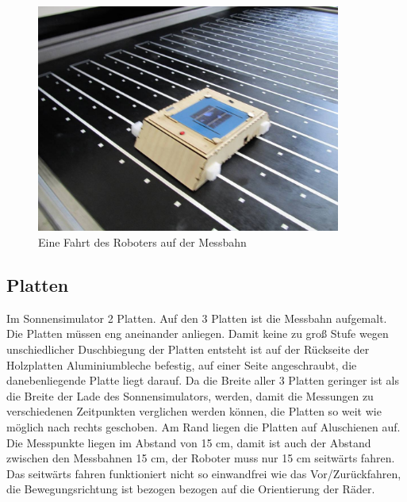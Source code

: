 \documentclass[a4paper,bibtotoc,oneside]{scrbook}
\begin{document}
\begin{figure}[htbp]
\centering
\includegraphics[width=100mm]{img/robofahrt.jpg}
\caption{Eine Fahrt des Roboters auf der Messbahn}\label{robofahrt}
\end{figure}

  \subsection{Platten}\thispagestyle{empty}
Im Sonnensimulator 2 Platten. Auf den 3 Platten ist die Messbahn aufgemalt.
Die Platten müssen eng aneinander anliegen. Damit keine zu groß Stufe wegen unschiedlicher Duschbiegung der Platten entsteht ist auf der Rückseite der Holzplatten Aluminiumbleche befestig, auf einer Seite angeschraubt, die danebenliegende Platte liegt darauf.
Da die Breite aller 3 Platten geringer ist als die Breite der Lade des Sonnensimulators, werden, damit die Messungen zu verschiedenen Zeitpunkten verglichen werden können, die Platten so weit wie möglich nach rechts geschoben. Am Rand liegen die Platten auf Aluschienen auf.
Die Messpunkte liegen im Abstand von 15 cm, damit ist auch der Abstand zwischen den Messbahnen 15 cm, der Roboter muss nur 15 cm seitwärts fahren. Das seitwärts fahren funktioniert nicht so einwandfrei wie das  Vor/Zurückfahren, die Bewegungsrichtung ist bezogen bezogen auf die Orientierung der Räder.
\end{document}
